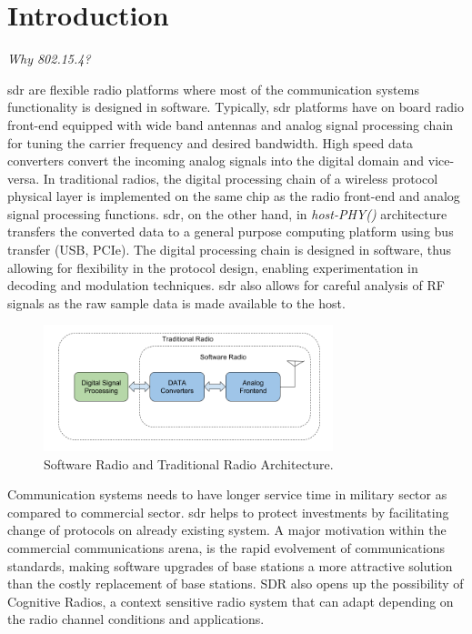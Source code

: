 \chapter{Introduction}
\textit{ Why 802.15.4?}

\ac{sdr} are flexible radio platforms where most of the communication systems functionality is designed in software. Typically, \ac{sdr} platforms have on board radio front-end equipped with wide band antennas and analog signal processing chain for tuning the carrier frequency and desired bandwidth. High speed data converters convert the incoming analog signals into the digital domain and vice-versa. In traditional radios, the digital processing chain of a wireless protocol physical layer is implemented on the same chip as the radio front-end and analog signal processing functions. \ac{sdr}, on the other hand, in \textit{host-PHY(\cite{schmid_experimental_2007})} architecture transfers the converted data to a general purpose computing platform using bus transfer (USB, PCIe).  The digital processing chain is designed in software, thus allowing for flexibility in the protocol design, enabling experimentation in decoding and modulation techniques. \ac{sdr} also allows for careful analysis of RF signals as the raw sample data is made available to the host.\\

\begin{figure}[!h]
\centering
\includegraphics[width=0.75\textwidth]{Figure/SDRSystem.png}
\caption{Software Radio and Traditional Radio Architecture.}
\label{sdr_architecture}
\end{figure}


Communication systems needs to have longer service time in military sector as compared to commercial sector. \ac{sdr} helps to protect investments by facilitating change of protocols on already existing system. A major motivation within the commercial communications arena, is the rapid evolvement of communications standards, making software upgrades of base stations a more attractive solution than the costly replacement of base stations\cite{ulversoy_software_2010}. SDR also opens up the possibility of Cognitive Radios, a context sensitive radio system that can adapt depending on the radio channel conditions and applications. \\

